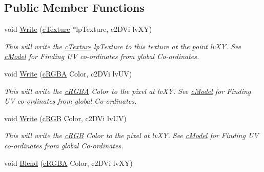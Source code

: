 \subsection*{Public Member Functions}
\begin{DoxyCompactItemize}
\item 
\hypertarget{classc_dynamic_texture_a16f6fc244df71bce33a7d0c9a84a75c1}{
void \hyperlink{classc_dynamic_texture_a16f6fc244df71bce33a7d0c9a84a75c1}{Write} (\hyperlink{classc_texture}{cTexture} $\ast$lpTexture, c2DVi lvXY)}
\label{classc_dynamic_texture_a16f6fc244df71bce33a7d0c9a84a75c1}

\begin{DoxyCompactList}\small\item\em This will write the \hyperlink{classc_texture}{cTexture} lpTexture to this texture at the point lvXY. See \hyperlink{classc_model}{cModel} for Finding UV co-\/ordinates from global Co-\/ordinates. \end{DoxyCompactList}\item 
\hypertarget{classc_dynamic_texture_a2bb785bf53b569b367b713439dcd47ee}{
void \hyperlink{classc_dynamic_texture_a2bb785bf53b569b367b713439dcd47ee}{Write} (\hyperlink{classc_r_g_b_a}{cRGBA} Color, c2DVi lvUV)}
\label{classc_dynamic_texture_a2bb785bf53b569b367b713439dcd47ee}

\begin{DoxyCompactList}\small\item\em This will write the \hyperlink{classc_r_g_b_a}{cRGBA} Color to the pixel at lvXY. See \hyperlink{classc_model}{cModel} for Finding UV co-\/ordinates from global Co-\/ordinates. \end{DoxyCompactList}\item 
\hypertarget{classc_dynamic_texture_a02b95de0bf55a4d07dff79e6e13e4844}{
void \hyperlink{classc_dynamic_texture_a02b95de0bf55a4d07dff79e6e13e4844}{Write} (\hyperlink{classc_r_g_b}{cRGB} Color, c2DVi lvUV)}
\label{classc_dynamic_texture_a02b95de0bf55a4d07dff79e6e13e4844}

\begin{DoxyCompactList}\small\item\em This will write the \hyperlink{classc_r_g_b}{cRGB} Color to the pixel at lvXY. See \hyperlink{classc_model}{cModel} for Finding UV co-\/ordinates from global Co-\/ordinates. \end{DoxyCompactList}\item 
\hypertarget{classc_dynamic_texture_a2fecb4e2bdb90bbc0bad8827b2db022b}{
void \hyperlink{classc_dynamic_texture_a2fecb4e2bdb90bbc0bad8827b2db022b}{Blend} (\hyperlink{classc_r_g_b_a}{cRGBA} Color, c2DVi lvXY)}
\label{classc_dynamic_texture_a2fecb4e2bdb90bbc0bad8827b2db022b}


\end{DoxyCompactItemize}
